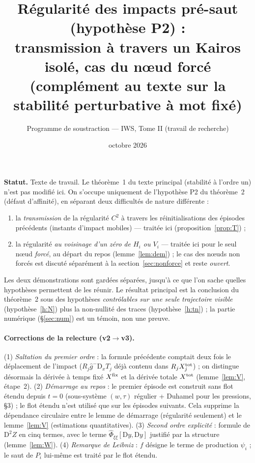 \documentclass[11pt,a4paper]{article}
\title{Régularité des impacts pré-saut (hypothèse P2) :\\
transmission à travers un Kairos isolé, cas du n\oe ud forcé\\[2pt]
\large (complément au texte sur la stabilité perturbative à mot fixé)}
\author{Programme de soustraction --- IWS, Tome II (travail de recherche)}
\date{octobre 2026}
\theoremstyle{remark}
\theoremstyle{definition}
\newcommand{\D}{\mathrm D}
\begin{document}
\maketitle

\noindent\textbf{Statut.} Texte de travail. Le théorème~1 du texte principal (stabilité à l'ordre un) n'est pas modifié ici. On s'occupe uniquement de l'hypothèse P2 du théorème~2 (défaut d'affinité), en séparant deux difficultés de nature différente :

\begin{enumerate}[nosep,label=(\Alph*)]
\item la \emph{transmission} de la régularité $C^2$ à travers les réinitialisations des épisodes précédents (instants d'impact mobiles) --- traitée ici (proposition~\ref{prop:T}) ;
\item la régularité \emph{au voisinage d'un zéro de $H_i$ ou $V_i$} --- traitée ici pour le seul n\oe ud \emph{forcé}, au départ du repos (lemme~\ref{lem:dem}) ; le cas des n\oe uds non forcés est discuté séparément à la section~\ref{sec:nonforce} et reste \emph{ouvert}.
\end{enumerate}

\noindent Les deux démonstrations sont gardées séparées, jusqu'à ce que l'on sache quelles hypothèses permettent de les réunir. Le résultat principal est la conclusion du théorème~2 sous des hypothèses \emph{contrôlables sur une seule trajectoire visible} (hypothèse~\ref{h:N}) plus la non-nullité des traces (hypothèse~\ref{h:tn}) ; la partie numérique (§\ref{sec:num}) est un témoin, non une preuve.

\paragraph{Corrections de la relecture (v2$\to$v3).} (1) \emph{Saltation du premier ordre} : la formule précédente comptait deux fois le déplacement de l'impact ($R_j\hat g^-\D_xT_j$ déjà contenu dans $R_jX^{\rm tot}_j$) ; on distingue désormais la dérivée à temps fixé $X^{\rm fix}$ et la dérivée totale $X^{\rm tot}$ (lemme~\ref{lem:V}, étape~2). (2) \emph{Démarrage au repos} : le premier épisode est construit sans flot étendu depuis $t=0$ (sous-système $(w,\tau)$ régulier + Duhamel pour les pressions, §3) ; le flot étendu n'est utilisé que sur les épisodes suivants. Cela supprime la dépendance circulaire entre le lemme de démarrage (régularité seulement) et le lemme~\ref{lem:V} (estimations quantitatives). (3) \emph{Second ordre explicité} : formule de $\D^2Z$ en cinq termes, avec le terme $\hat\Phi_{\xi\xi}[\D y,\D y]$ justifié par la structure (lemme~\ref{lem:W}). (4) \emph{Remarque de Leibniz} : $f$ désigne le terme de production $\psi_i$ ; le saut de $P_i$ lui-même est traité par le flot étendu.
\end{document}
